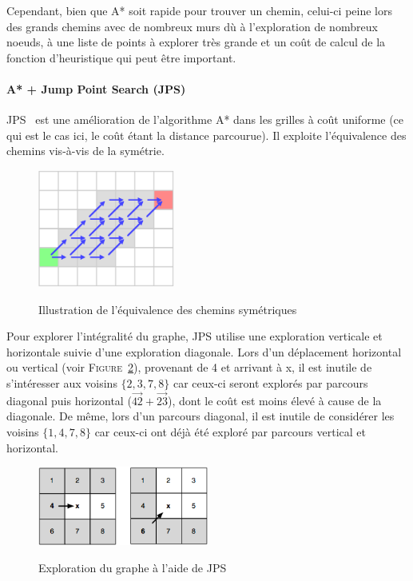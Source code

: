 Cependant, bien que A* soit rapide pour trouver un chemin, celui-ci peine lors des grands chemins avec de nombreux murs dù à l'exploration de nombreux noeuds, à une liste de points à explorer très grande et un coût de calcul de la fonction d'heuristique qui peut être important.

\paragraph{A* + Jump Point Search (JPS)\\}
JPS~\cite{jps_article} est une amélioration de l'algorithme A* dans les grilles à coût uniforme (ce qui est le cas ici, le coût étant la distance parcourue).
Il exploite l'équivalence des chemins vis-à-vis de la symétrie.

\begin{figure}[h!]
	\centering
	\includegraphics[width=0.4\textwidth]{symetrie_JPS.png}
	\\[0.2cm]
	\caption{Illustration de l'équivalence des chemins symétriques}
	\label{fig:symetrie_JPS}
\end{figure}

Pour explorer l'intégralité du graphe, JPS utilise une exploration verticale et horizontale suivie d'une exploration diagonale.
Lors d'un déplacement horizontal ou vertical (voir \textsc{Figure}~\ref{fig:explo_jps}), provenant de 4 et arrivant à x, il est inutile de s'intéresser aux voisins $\{2, 3, 7, 8\}$ car ceux-ci seront explorés par parcours diagonal puis horizontal ($\overrightarrow{42} + \overrightarrow{23}$), dont le coût est moins élevé à cause de la diagonale.
De même, lors d'un parcours diagonal, il est inutile de considérer les voisins $\{1, 4, 7, 8\}$ car ceux-ci ont déjà été exploré par parcours vertical et horizontal.

\begin{figure}[h!]
	\centering
	\includegraphics[width=0.5\textwidth]{explo_jps.png}
	\\[0.2cm]
	\caption{Exploration du graphe à l'aide de JPS}
	\label{fig:explo_jps}
\end{figure}

